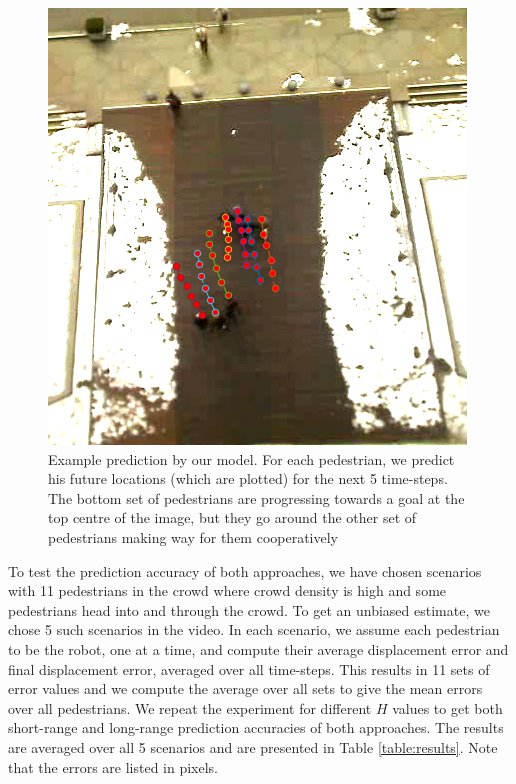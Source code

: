 \begin{figure}[t!]
  \centering
  \includegraphics[scale=0.35]{Figures/igp2-crop.png}
  \caption{Example prediction by our model. For each pedestrian, we predict his future locations (which are plotted) for the next 5 time-steps. The bottom set of pedestrians are progressing towards a goal at the top centre of the image, but they go around the other set of pedestrians making way for them cooperatively}
  \label{fig:bestcase}
\end{figure}

To test the prediction accuracy of both approaches, we have chosen scenarios with 11 pedestrians in the crowd where crowd density is high and some pedestrians head into and through the crowd. To get an unbiased estimate, we chose 5 such scenarios in the video. In each scenario, we assume each pedestrian to be the robot, one at a time, and compute their average displacement error and final displacement error, averaged over all time-steps. This results in 11 sets of error values and we compute the average over all sets to give the mean errors over all pedestrians. We repeat the experiment for different $H$ values to get both short-range and long-range prediction accuracies of both approaches. The results are averaged over all 5 scenarios and are presented in Table \ref{table:results}. Note that the errors are listed in pixels.

